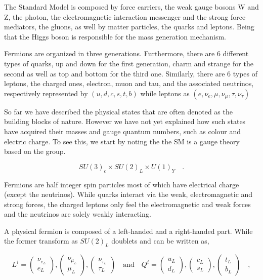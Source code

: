 { \color{red} 
The Standard Model is composed by force carriers, the weak gauge bosons W and Z, the photon, the electromagnetic interaction messenger and the strong force mediators, the gluons, as well by matter particles, the quarks and leptons. Being that the Higgs boson is responsible for the mass generation mechanism.

Fermions are organized in three generations. Furthermore, there are 6 different types of quarks, up and down for the first generation, charm and strange for the second as well as top and bottom for the third one. Similarly, there are 6 types of leptons, the charged ones, electron, muon and tau, and the associated neutrinos, respectively represented by $(u,d,c,s,t,b)$ while leptons as $(e,\nu_{e},\mu,\nu_{\mu},\tau,\nu_{\tau})$

So far we have described the physical states that are often denoted as the building blocks of nature. However we have not yet explained how such states have acquired their masses and gauge quantum numbers, such as colour and electric charge. To see this, we start by noting the the SM is a gauge theory based on the group.

\begin{equation}
SU(3)_c \times SU(2)_L \times U(1)_Y \quad  .
\label{SMsymmetry}
\end{equation} 

Fermions are half integer spin particles most of which have electrical charge (except the neutrinos).  While quarks interact via the weak, electromagnetic and strong forces, the charged leptons only feel the electromagnetic and weak forces and the neutrinos are solely weakly interacting.  

A physical fermion is composed of a left-handed and a right-handed part. While the former transform as $SU(2)_L$ doublets and can be written as,

\begin{equation}
L^i= \begin{pmatrix}
\nu_{e_L} \\
e_L 
\end{pmatrix},\begin{pmatrix}
\nu_{\mu_L} \\
\mu_L 
\end{pmatrix}
,\begin{pmatrix}
\nu_{\tau_L} \\
\tau_L 
\end{pmatrix} \quad \text{and} \quad Q^i= \begin{pmatrix}
u_{L} \\
d_L 
\end{pmatrix},\begin{pmatrix}
c_{L} \\
s_L 
\end{pmatrix}
,\begin{pmatrix}
t_{L} \\
b_L 
\end{pmatrix} \quad ,
\end{equation}

}